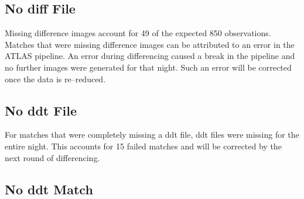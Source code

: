 \subsection{No diff File}
\indent Missing difference images account for 49 of the expected 850 observations. 
Matches that were missing difference images can be attributed to an error in the 
ATLAS pipeline. An error during differencing caused a break in the pipeline and no 
further images were generated for that night. Such an error will be corrected once 
the data is re--reduced.


\subsection{No ddt File}
\indent For matches that were completely missing a ddt file, ddt files were missing 
for the entire night. This accounts for 15 failed matches and will be corrected by 
the next round of differencing.


\subsection{No ddt Match}\label{sec:noddtline}

